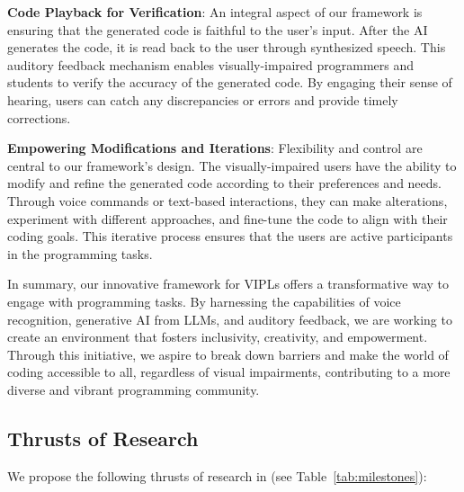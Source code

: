 {\bf Code Playback for Verification}: An integral aspect of our
framework is ensuring that the generated code is faithful to the
user's input. After the AI generates the code, it is read back to the
user through synthesized speech. This auditory feedback mechanism
enables visually-impaired programmers and students to verify the
accuracy of the generated code. By engaging their sense of hearing,
users can catch any discrepancies or errors and provide timely
corrections.

  
{\bf Empowering Modifications and Iterations}: Flexibility and control
are central to our framework's design. The visually-impaired users
have the ability to modify and refine the generated code according to
their preferences and needs. Through voice commands or text-based
interactions, they can make alterations, experiment with different
approaches, and fine-tune the code to align with their coding
goals. This iterative process ensures that the users are active
participants in the programming tasks.

In summary, our innovative framework for VIPLs offers a transformative
way to engage with programming tasks. By harnessing the capabilities
of voice recognition, generative AI from LLMs, and auditory feedback,
we are working to create an environment that fosters inclusivity,
creativity, and empowerment. Through this initiative, we aspire to
break down barriers and make the world of coding accessible to all,
regardless of visual impairments, contributing to a more diverse and
vibrant programming community.

\subsection{Thrusts of Research}

We propose the following thrusts of research in {\tool} (see Table~\ref{tab:milestones}):


